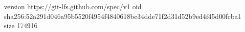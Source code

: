version https://git-lfs.github.com/spec/v1
oid sha256:52a291d046a95b5520f4954f4840618bc34dde71f2d31d52b9ed4f45d00fcba1
size 174916
